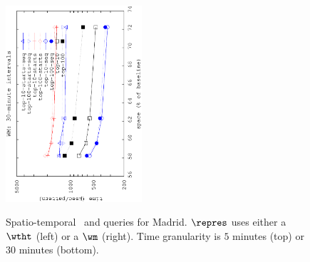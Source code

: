 \begin{figure}[!ht]
\begin{center}
		{\includegraphics[angle=-90,width=0.45\textwidth]{figures_synt/madrid_st_topk_wm_30.eps}}
		
	\end{center}
	\vspace{-0.3cm}
	\caption{Spatio-temporal {\Stk\ and \Stks} queries for Madrid. $\repres$ uses either a $\wtht$ (left) or a $\wm$ (right). 
		Time granularity is $5$ minutes (top) or $30$ minutes (bottom). 
	}
	\label{fig:madridst.tk}

	\vspace{-0.2cm}
	\begin{center}


\end{center}
\end{figure}
